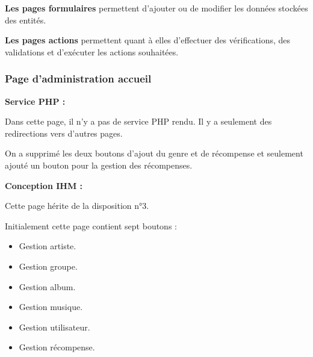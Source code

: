         \begin{paragraphe}
            \textbf{Les pages formulaires} permettent d'ajouter ou de modifier les données stockées des entités.
        \end{paragraphe}
        
        \begin{paragraphe}
            \textbf{Les pages actions} permettent quant à elles d'effectuer des vérifications, des validations et d'exécuter les actions souhaitées.
        \end{paragraphe}

		\subsubsection{Page d'administration accueil}

			\begin{paragraphe}
				\textbf{Service PHP :}
			\end{paragraphe}

			\begin{paragraphe}
				Dans cette page, il n'y a pas de service PHP rendu. Il y a seulement des redirections vers d'autres pages.
			\end{paragraphe}

			\begin{paragraphe}
                On a supprimé les deux boutons d'ajout du genre et de récompense et seulement ajouté un bouton pour la gestion des récompenses.
			\end{paragraphe}
            
			\begin{paragraphe}
				\textbf{Conception IHM :}
			\end{paragraphe}

			\begin{paragraphe}
				Cette page hérite de la disposition n°3. \par
				Initialement cette page contient sept boutons :
				\begin{itemize}
					\item Gestion artiste.
					\item Gestion groupe.
					\item Gestion album.
					\item Gestion musique.
					\item Gestion utilisateur.
                    \item Gestion récompense.
				\end{itemize}
			\end{paragraphe}

